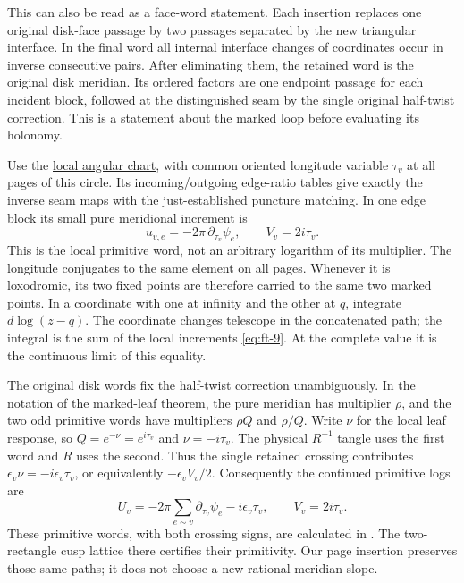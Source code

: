 This can also be read as a face-word statement. Each insertion replaces one original disk-face passage by two passages separated by the new triangular interface. In the final word all internal interface changes of coordinates occur in inverse consecutive pairs. After eliminating them, the retained word is the original disk meridian. Its ordered factors are one endpoint passage for each incident block, followed at the distinguished seam by the single original half-twist correction. This is a statement about the marked loop before evaluating its holonomy.

Use the \hyperref[sec:fa]{local angular chart}, with common oriented longitude variable \(\tau_v\) at all pages of this circle. Its incoming/outgoing edge-ratio tables give exactly the inverse seam maps with the just-established puncture matching. In one edge block its small pure meridional increment is
\begin{equation}
u_{v,e}=-2\pi\,\partial_{\tau_v}\psi_e,
 \qquad V_v=2i\tau_v.
\label{eq:ft-9}
\end{equation}
This is the local primitive word, not an arbitrary logarithm of its multiplier. The longitude conjugates to the same element on all pages. Whenever it is loxodromic, its two fixed points are therefore carried to the same two marked points. In a coordinate with one at infinity and the other at \(q\), integrate \(d\log(z-q)\). The coordinate changes telescope in the concatenated path; the integral is the sum of the local increments \eqref{eq:ft-9}. At the complete value it is the continuous limit of this equality.

The original disk words fix the half-twist correction unambiguously. In the notation of the marked-leaf theorem, the pure meridian has multiplier \(\rho\), and the two odd primitive words have multipliers \(\rho Q\) and \(\rho/Q\). Write \(\nu\) for the local leaf response, so \(Q=e^{-\nu}=e^{i\tau_v}\) and \(\nu=-i\tau_v\). The physical \(R^{-1}\) tangle uses the first word and \(R\) uses the second. Thus the single retained crossing contributes \(\epsilon_v\nu=-i\epsilon_v\tau_v\), or equivalently \(-\epsilon_vV_v/2\). Consequently the continued primitive logs are
\begin{equation}
U_v=-2\pi\sum_{e\sim v}\partial_{\tau_v}\psi_e
                   -i\epsilon_v\tau_v,
 \qquad V_v=2i\tau_v.
\label{eq:ft-10}
\end{equation}
These primitive words, with both crossing signs, are calculated in
\cite[Sections~2.1 and~3.2]{CircleTreeGeometry}.
The two-rectangle cusp lattice there certifies their primitivity. Our page insertion preserves those same paths; it does not choose a new rational meridian slope.

